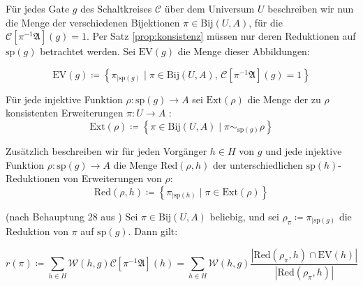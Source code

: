 \begin{defn}
Für jedes Gate $g$ des Schaltkreises $\mathcal{C}$ über dem Universum
$U$ beschreiben wir nun die Menge der verschiedenen Bijektionen $\pi\in\mathrm{Bij}\left(U,A\right)$,
für die $\mathcal{C}\left[\pi^{-1}\mathfrak{A}\right]\left(g\right)=1$.
Per Satz \ref{prop:konsistenz} müssen nur deren Reduktionen auf $\mathrm{sp}\left(g\right)$
betrachtet werden. Sei $\mathrm{EV}\left(g\right)$ die Menge dieser
Abbildungen:

\[
\mathrm{EV}\left(g\right)\coloneqq\left\{ \pi{}_{\mid\mathrm{sp}\left(g\right)}\mid\pi\in\mathrm{Bij}\left(U,A\right),\,\mathcal{C}\left[\pi^{-1}\mathfrak{A}\right]\left(g\right)=1\right\} 
\]

Für jede injektive Funktion $\rho:\mathrm{sp}\left(g\right)\rightarrow A$
sei $\mathrm{Ext}\left(\rho\right)$ die Menge der zu $\rho$ konsistenten
Erweiterungen $\pi:U\rightarrow A$ :
\[
\mathrm{Ext}\left(\rho\right)\coloneqq\left\{ \pi\in\mathrm{Bij}\left(U,A\right)\mid\pi\sim_{\mathrm{sp}\left(g\right)}\rho\right\} 
\]

Zusätzlich beschreiben wir für jeden Vorgänger $h\in H$ von $g$
und jede injektive Funktion $\rho:\mathrm{sp}\left(g\right)\rightarrow A$
die Menge $\mathrm{Red}\left(\rho,h\right)$ der unterschiedlichen
$\mathrm{sp}\left(h\right)$-Reduktionen von Erweiterungen von $\rho$:
\[
\mathrm{Red}\left(\rho,h\right)\coloneqq\left\{ \pi_{\mid\mathrm{sp}\left(h\right)}\mid\pi\in\mathrm{Ext}\left(\rho\right)\right\} 
\]
\end{defn}
\begin{claim}
\label{claim:claim-28}(nach Behauptung 28 aus \cite{AD2014}) Sei
$\pi\in\mathrm{Bij}\left(U,A\right)$ beliebig, und sei $\rho_{\pi}\coloneqq\pi_{\mid\mathrm{sp}\left(g\right)}$
die Reduktion von $\pi$ auf $\mathrm{sp}\left(g\right)$. Dann gilt:

\begin{equation}
r\left(\pi\right)\coloneqq\sum_{h\in H}\mathcal{W}\left(h,g\right)\mathcal{C}\left[\pi^{-1}\mathfrak{A}\right]\left(h\right)=\sum_{h\in H}\mathcal{W}\left(h,g\right)\frac{\left|\mathrm{Red}\left(\rho_{\pi},h\right)\cap\mathrm{EV}\left(h\right)\right|}{\left|\mathrm{Red}\left(\rho_{\pi},h\right)\right|}\label{eq:behauptung-28}
\end{equation}
\end{claim}
